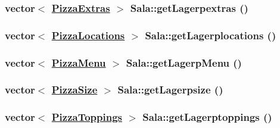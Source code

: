 \hypertarget{class_sala_49f231948b80188691882a8624a4612d}{
\subsubsection[getLagerpextras]{\setlength{\rightskip}{0pt plus 5cm}vector$<$ \hyperlink{class_pizza_extras}{Pizza\-Extras} $>$ Sala::get\-Lagerpextras ()}}
\label{class_sala_49f231948b80188691882a8624a4612d}


\hypertarget{class_sala_1e720a42845186f5057b36ab8b69711a}{
\subsubsection[getLagerplocations]{\setlength{\rightskip}{0pt plus 5cm}vector$<$ \hyperlink{class_pizza_locations}{Pizza\-Locations} $>$ Sala::get\-Lagerplocations ()}}
\label{class_sala_1e720a42845186f5057b36ab8b69711a}


\hypertarget{class_sala_89b38b3e2a9835524c9fd21628f485cc}{
\subsubsection[getLagerpMenu]{\setlength{\rightskip}{0pt plus 5cm}vector$<$ \hyperlink{class_pizza_menu}{Pizza\-Menu} $>$ Sala::get\-Lagerp\-Menu ()}}
\label{class_sala_89b38b3e2a9835524c9fd21628f485cc}


\hypertarget{class_sala_3b0fc00a14ac87f5c78a4ec2f508d67b}{
\subsubsection[getLagerpsize]{\setlength{\rightskip}{0pt plus 5cm}vector$<$ \hyperlink{class_pizza_size}{Pizza\-Size} $>$ Sala::get\-Lagerpsize ()}}
\label{class_sala_3b0fc00a14ac87f5c78a4ec2f508d67b}


\hypertarget{class_sala_aeb754b87d63d395a61539294cbdf064}{
\subsubsection[getLagerptoppings]{\setlength{\rightskip}{0pt plus 5cm}vector$<$ \hyperlink{class_pizza_toppings}{Pizza\-Toppings} $>$ Sala::get\-Lagerptoppings ()}}
\label{class_sala_aeb754b87d63d395a61539294cbdf064}



